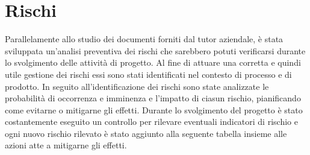 \newpage

\section{Rischi}

Parallelamente allo studio dei documenti forniti dal tutor aziendale, è stata sviluppata un'analisi preventiva dei rischi che sarebbero potuti verificarsi durante lo svolgimento delle attività di progetto. Al fine di attuare una corretta e quindi utile gestione dei rischi essi sono stati identificati nel contesto di processo e di prodotto. In seguito all'identificazione dei rischi sono state analizzate le probabilità di occorrenza e imminenza e l'impatto di ciasun rischio, pianificando come evitarne o mitigarne gli effetti. Durante lo svolgimento del progetto è stato costantemente eseguito un controllo per rilevare eventuali indicatori di rischio e ogni nuovo rischio rilevato è stato aggiunto alla seguente tabella insieme alle azioni atte a mitigarne gli effetti.

